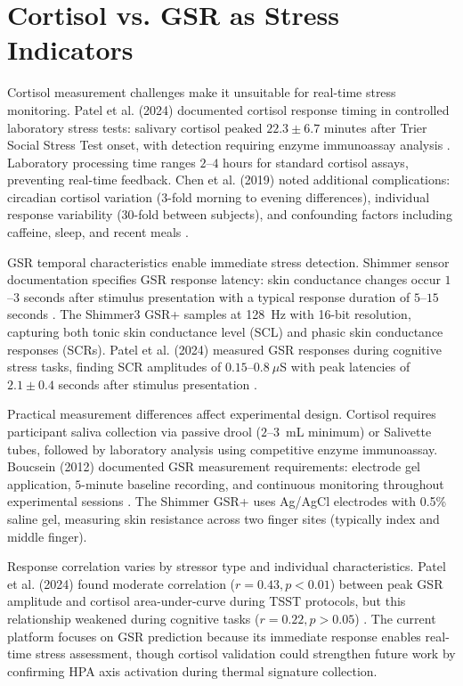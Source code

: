 \documentclass{report}
\begin{document}
    \section{Cortisol vs. GSR as Stress Indicators}
    \label{sec:cortisol_vs_gsr}

    Cortisol measurement challenges make it unsuitable for real-time stress monitoring. Patel et al. (2024) documented cortisol response timing in controlled laboratory stress tests: salivary cortisol peaked $22.3 \pm 6.7$ minutes after Trier Social Stress Test onset, with detection requiring enzyme immunoassay analysis \cite{patel2024}. Laboratory processing time ranges $2$--$4$ hours for standard cortisol assays, preventing real-time feedback. Chen et al. (2019) noted additional complications: circadian cortisol variation ($3$-fold morning to evening differences), individual response variability ($30$-fold between subjects), and confounding factors including caffeine, sleep, and recent meals \cite{chen2019}.

    GSR temporal characteristics enable immediate stress detection. Shimmer sensor documentation specifies GSR response latency: skin conductance changes occur $1$--$3$ seconds after stimulus presentation with a typical response duration of $5$--$15$ seconds \cite{shimmerdoc8}. The Shimmer3 GSR+ samples at 128~Hz with 16-bit resolution, capturing both tonic skin conductance level (SCL) and phasic skin conductance responses (SCRs). Patel et al. (2024) measured GSR responses during cognitive stress tasks, finding SCR amplitudes of $0.15$--$0.8~\mu$S with peak latencies of $2.1 \pm 0.4$ seconds after stimulus presentation \cite{patel2024}.

    Practical measurement differences affect experimental design. Cortisol requires participant saliva collection via passive drool ($2$--$3$~mL minimum) or Salivette tubes, followed by laboratory analysis using competitive enzyme immunoassay. Boucsein (2012) documented GSR measurement requirements: electrode gel application, $5$-minute baseline recording, and continuous monitoring throughout experimental sessions \cite{boucsein2012}. The Shimmer GSR+ uses Ag/AgCl electrodes with 0.5\% saline gel, measuring skin resistance across two finger sites (typically index and middle finger).

    Response correlation varies by stressor type and individual characteristics. Patel et al. (2024) found moderate correlation ($r = 0.43, p < 0.01$) between peak GSR amplitude and cortisol area-under-curve during TSST protocols, but this relationship weakened during cognitive tasks ($r = 0.22, p > 0.05$) \cite{patel2024}. The current platform focuses on GSR prediction because its immediate response enables real-time stress assessment, though cortisol validation could strengthen future work by confirming HPA axis activation during thermal signature collection.
\end{document}
